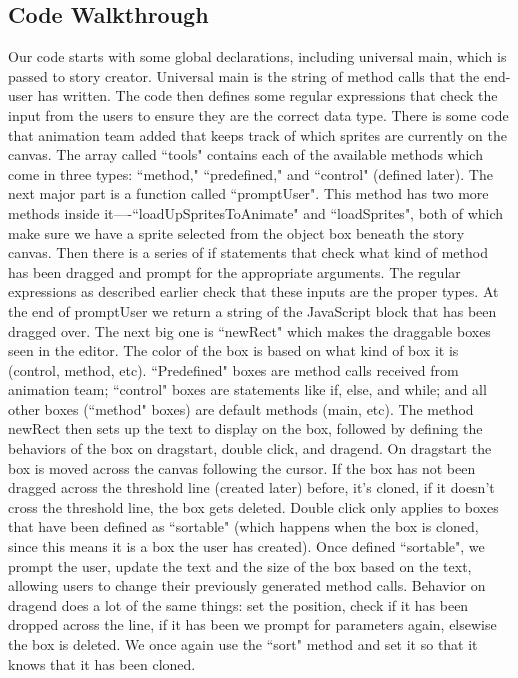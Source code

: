 \documentclass[a4paper]{article}
\begin{document}
\subsection{Code Walkthrough}
Our code starts with some global declarations, including universal main, which is passed to story creator. Universal main is the string of method calls that the end-user has written. The code then defines some regular expressions that check the input from the users to ensure they are the correct data type. There is some code that animation team added that keeps track of which sprites are currently on the canvas. The array called ``tools" contains each of the available methods which come in three types: ``method," ``predefined," and ``control" (defined later). The next major part is a function called ``promptUser". This method has two more methods inside it—-``loadUpSpritesToAnimate" and ``loadSprites", both of which make sure we have a sprite selected from the object box beneath the story canvas. Then there is a series of if statements that check what kind of method has been dragged and prompt for the appropriate arguments. The regular expressions as described earlier check that these inputs are the proper types. At the end of promptUser we return a string of the JavaScript block that has been dragged over. \newline \newline 
The next big one is ``newRect" which makes the draggable boxes seen in the editor. The color of the box is based on what kind of box it is (control, method, etc). ``Predefined" boxes are method calls received from animation team; ``control" boxes are statements like if, else, and while; and all other boxes (``method" boxes) are default methods (main, etc). The method newRect then sets up the text to display on the box, followed by defining the behaviors of the box on dragstart, double click, and dragend. On dragstart the box is moved across the canvas following the cursor. If the box has not been dragged across the threshold line (created later) before, it's cloned, if it doesn't cross the threshold line, the box gets deleted. Double click only applies to boxes that have been defined as ``sortable" (which happens when the box is cloned, since this means it is a box the user has created). Once defined ``sortable", we prompt the user, update the text and the size of the box based on the text, allowing users to change their previously generated method calls. Behavior on dragend does a lot of the same things: set the position, check if it has been dropped across the line, if it has been we prompt for parameters again, elsewise the box is deleted. We once again use the ``sort" method and set it so that it knows that it has been cloned.\newline \newline 
\end{document}
